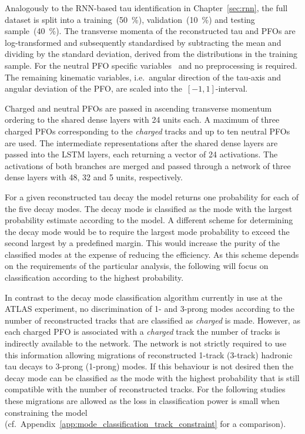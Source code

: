 Analogously to the RNN-based tau identification in Chapter~\ref{sec:rnn}, the
full dataset is split into a training~(\SI{50}{\percent}),
validation~(\SI{10}{\percent}) and testing sample~(\SI{40}{\percent}). The
transverse momenta of the reconstructed tau and PFOs are log-transformed and
subsequently standardised by subtracting the mean and dividing by the standard
deviation, derived from the distributions in the training sample. For the
neutral PFO specific variables~ and
 no preprocessing is required. The remaining kinematic
variables, i.e.\ angular direction of the tau-axis and angular deviation of the
PFO, are scaled into the~$[-1, 1]$-interval.

Charged and neutral PFOs are passed in ascending transverse momentum ordering to
the shared dense layers with 24 units each. A maximum of three charged PFOs
corresponding to the \emph{charged} tracks and up to ten neutral PFOs are used.
The intermediate representations after the shared dense layers are passed into
the LSTM layers, each returning a vector of 24 activations. The activations of
both branches are merged and passed through a network of three dense layers with
48, 32 and 5 units, respectively.

For a given reconstructed tau decay the model returns one probability for each
of the five decay modes. The decay mode is classified as the mode with the
largest probability estimate according to the model. A different scheme for
determining the decay mode would be to require the largest mode probability to
exceed the second largest by a predefined margin. This would increase the purity
of the classified modes at the expense of reducing the efficiency. As this
scheme depends on the requirements of the particular analysis, the following
will focus on classification according to the highest probability.

In contrast to the decay mode classification algorithm currently in use at the
ATLAS experiment, no discrimination of 1- and 3-prong modes according to the
number of reconstructed tracks that are classified as \emph{charged} is made.
However, as each charged PFO is associated with a \emph{charged} track the
number of tracks is indirectly available to the network. The network is not
strictly required to use this information allowing migrations of reconstructed
1-track (3-track) hadronic tau decays to 3-prong (1-prong) modes. If this
behaviour is not desired then the decay mode can be classified as the mode with
the highest probability that is still compatible with the number of
reconstructed tracks. For the following studies these migrations are allowed as
the loss in classification power is small when constraining the model (cf.\
Appendix~\ref{app:mode_classification_track_constraint} for a comparison).

